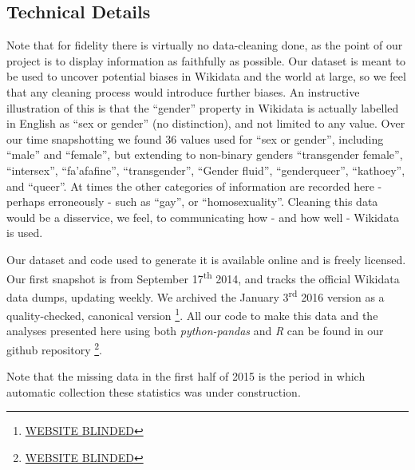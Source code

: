 \documentclass{sig-alternate-05-2015}
\begin{document}
\subsection{Technical Details}

Note that for fidelity there is virtually no data-cleaning done, as the point of our project is to display information as faithfully as possible. Our dataset is meant to be used to uncover potential biases in Wikidata and the world at large, so we feel that any cleaning process would introduce further biases. An instructive illustration of this is that the ``gender'' property in Wikidata is actually labelled in English  as ``sex or gender'' (no distinction), and not limited to any value. Over our time snapshotting we found 36 values used for ``sex or gender'', including ``male'' and ``female'', but extending to non-binary genders ``transgender female'', ``intersex'', ``fa'afafine'', ``transgender'', ``Gender fluid'',  ``genderqueer'', ``kathoey'', and ``queer''. At times the other categories of information are recorded here - perhaps erroneously - such as ``gay'', or ``homosexuality''. Cleaning this data would be a disservice, we feel, to communicating how - and how well - Wikidata is used.


Our dataset and code used to generate it is available online and is freely licensed. Our first snapshot is from September 17\textsuperscript{th} 2014, and tracks the official  Wikidata data dumps, updating weekly. We archived the January 3\textsuperscript{rd} 2016 version as a quality-checked, canonical version \footnote{\url{WEBSITE BLINDED}}. All our code to make this data and the analyses presented here using both \textit{python-pandas} and \textit{R} can be found in our github repository \footnote{\url{WEBSITE BLINDED}}.

Note that the missing data in the first half of 2015 is the period in which automatic collection these statistics was under construction.
\end{document}
